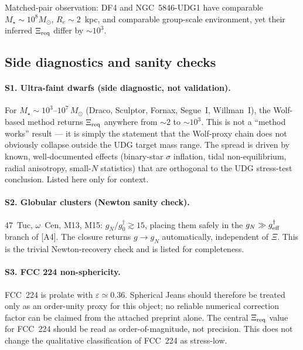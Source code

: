 \documentclass[11pt]{article}
\begin{document}
Matched-pair observation: DF4 and NGC~5846-UDG1 have comparable
$M_\star\sim 10^8M_\odot$, $R_e\sim 2$~kpc, and comparable group-scale
environment, yet their inferred $\Xi_{\rm req}$ differ by $\sim 10^3$.

\subsection{Side diagnostics and sanity checks}

\paragraph{S1. Ultra-faint dwarfs (side diagnostic, not validation).}
For $M_\star\sim 10^3$--$10^7\,M_\odot$ (Draco, Sculptor, Fornax,
Segue~I, Willman~I), the Wolf-based method returns $\Xi_{\rm req}$
anywhere from $\sim 2$ to $\sim 10^3$. This is not a ``method works''
result --- it is simply the statement that the Wolf-proxy chain does not
obviously collapse outside the UDG target mass range. The spread is
driven by known, well-documented effects (binary-star $\sigma$
inflation, tidal non-equilibrium, radial anisotropy, small-$N$
statistics) that are orthogonal to the UDG stress-test conclusion.
Listed here only for context.

\paragraph{S2. Globular clusters (Newton sanity check).}
47~Tuc, $\omega$~Cen, M13, M15: $g_N/g^\dagger_0 \gtrsim 15$, placing
them safely in the $g_N\gg g^\dagger_{\rm eff}$ branch of [A4]. The
closure returns $g\to g_N$ automatically, independent of $\Xi$. This is
the trivial Newton-recovery check and is listed for completeness.

\paragraph{S3. FCC 224 non-sphericity.}
FCC~224 is prolate with $\varepsilon\simeq 0.36$. Spherical Jeans
should therefore be treated only as an order-unity proxy for this
object; no reliable numerical correction factor can be claimed from
the attached preprint alone. The central $\Xi_{\rm req}$ value for
FCC~224 should be read as order-of-magnitude, not precision. This does
not change the qualitative classification of FCC~224 as stress-low.
\end{document}
